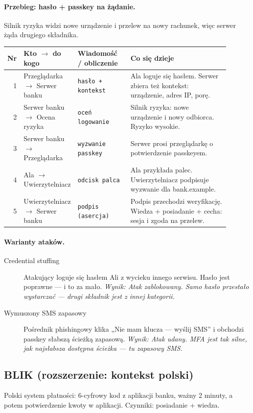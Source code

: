 \paragraph{Przebieg: hasło + passkey na żądanie.} Silnik ryzyka widzi nowe urządzenie i przelew na nowy rachunek, więc serwer żąda drugiego składnika.
\begingroup\footnotesize
\begin{longtable}{@{}r p{0.2\linewidth} p{0.24\linewidth} p{0.46\linewidth}@{}}
\toprule
Nr & Kto $\rightarrow$ do kogo & Wiadomość / obliczenie & Co się dzieje \\
\midrule
\endhead
1 & Przeglądarka $\rightarrow$ Serwer banku & \texttt{hasło + kontekst} & Ala loguje się hasłem. Serwer zbiera też kontekst: urządzenie, adres IP, porę. \\
2 & Serwer banku $\rightarrow$ Ocena ryzyka & \texttt{oceń logowanie} & Silnik ryzyka: nowe urządzenie i nowy odbiorca. Ryzyko wysokie. \\
3 & Serwer banku $\rightarrow$ Przeglądarka & \texttt{wyzwanie passkey} & Serwer prosi przeglądarkę o potwierdzenie passkeyem. \\
4 & Ala $\rightarrow$ Uwierzytelniacz & \texttt{odcisk palca} & Ala przykłada palec. Uwierzytelniacz podpisuje wyzwanie dla bank.example. \\
5 & Uwierzytelniacz $\rightarrow$ Serwer banku & \texttt{podpis (asercja)} & Podpis przechodzi weryfikację. Wiedza + posiadanie + cecha: sesja i zgoda na przelew. \\
\bottomrule
\end{longtable}
\endgroup

\paragraph{Warianty ataków.}
\begin{description}
\item[Credential stuffing] Atakujący loguje się hasłem Ali z wycieku innego serwisu. Hasło jest poprawne — i to za mało. \emph{Wynik: Atak zablokowany. Samo hasło przestało wystarczać — drugi składnik jest z innej kategorii.}
\item[Wymuszony SMS zapasowy] Pośrednik phishingowy klika „Nie mam klucza — wyślij SMS” i obchodzi passkey słabszą ścieżką zapasową. \emph{Wynik: Atak udany. MFA jest tak silne, jak najsłabsza dostępna ścieżka — tu zapasowy SMS.}
\end{description}

\subsection{BLIK (rozszerzenie: kontekst polski)}
\label{sec:mech-blik}
Polski system płatności: 6-cyfrowy kod z aplikacji banku, ważny 2 minuty, a potem potwierdzenie kwoty w aplikacji. Czynniki: posiadanie + wiedza. \cite{X7,N3,N7,P9}

